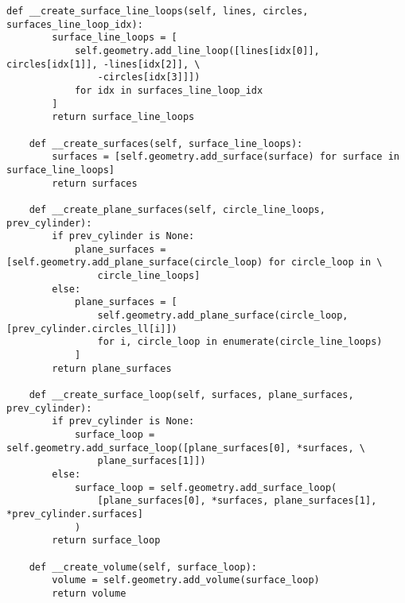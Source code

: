 \begin{lstlisting}[caption=Исходный код модуля генерации расчетной сетки и её маркировки, 
                    label={lst_meshgen_all}, basicstyle=\scriptsize]
    def __create_surface_line_loops(self, lines, circles, surfaces_line_loop_idx):
        surface_line_loops = [
            self.geometry.add_line_loop([lines[idx[0]], circles[idx[1]], -lines[idx[2]], \
                -circles[idx[3]]])
            for idx in surfaces_line_loop_idx
        ]
        return surface_line_loops

    def __create_surfaces(self, surface_line_loops):
        surfaces = [self.geometry.add_surface(surface) for surface in surface_line_loops]
        return surfaces

    def __create_plane_surfaces(self, circle_line_loops, prev_cylinder):
        if prev_cylinder is None:
            plane_surfaces = [self.geometry.add_plane_surface(circle_loop) for circle_loop in \
                circle_line_loops]
        else:
            plane_surfaces = [
                self.geometry.add_plane_surface(circle_loop, [prev_cylinder.circles_ll[i]])
                for i, circle_loop in enumerate(circle_line_loops)
            ]
        return plane_surfaces

    def __create_surface_loop(self, surfaces, plane_surfaces, prev_cylinder):
        if prev_cylinder is None:
            surface_loop = self.geometry.add_surface_loop([plane_surfaces[0], *surfaces, \
                plane_surfaces[1]])
        else:
            surface_loop = self.geometry.add_surface_loop(
                [plane_surfaces[0], *surfaces, plane_surfaces[1], *prev_cylinder.surfaces]
            )
        return surface_loop

    def __create_volume(self, surface_loop):
        volume = self.geometry.add_volume(surface_loop)
        return volume
\end{lstlisting}

